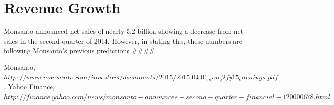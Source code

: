 \documentclass[11pt,letterpaper,english]{article}
\begin{document}
\section{Revenue Growth}
Monsanto announced net sales of nearly $5.2$ billion showing a decrease from net sales in the second quarter of 2014. However, in stating this, these numbers are following Monsanto's previous predictions \#\#\#\# 

\newpage
\begin{thebibliography}{9}
    Monsanto,
    \emph{$http://www.monsanto.com/investors/documents/2015/2015.04.01_mon_q2fy15_earnings.pdf$}.
     Yahoo Finance,
     \emph{$http://finance.yahoo.com/news/monsanto-announces-second-quarter-financial-120000678.html$}
\end{thebibliography}
\end{document}
